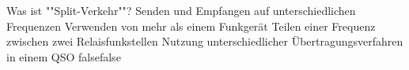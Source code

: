    {Was ist ""Split-Verkehr""?}
    {Senden und Empfangen auf unterschiedlichen Frequenzen}
    {Verwenden von mehr als einem Funkgerät}
    {Teilen einer Frequenz zwischen zwei Relaisfunkstellen}
    {Nutzung unterschiedlicher Übertragungsverfahren in einem QSO}
    {false}{false}